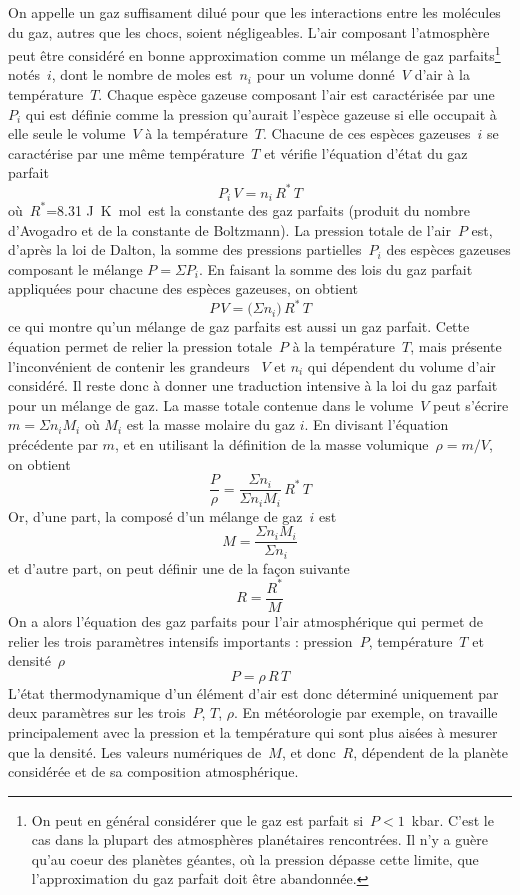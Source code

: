 \sk
On appelle  un gaz suffisament dilué pour que les interactions entre les molécules du gaz, autres que les chocs, soient négligeables. L'air composant l'atmosphère peut être considéré en bonne approximation comme un mélange de gaz parfaits\footnote{On peut en général considérer que le gaz est parfait si~$P < 1$~kbar. C'est le cas dans la plupart des atmosphères planétaires rencontrées. Il n'y a guère qu'au coeur des planètes géantes, où la pression dépasse cette limite, que l'approximation du gaz parfait doit être abandonnée.} notés~$i$, dont le nombre de moles est~$n_i$ pour un volume donné~$V$ d'air à la température~$T$. Chaque espèce gazeuse composant l'air est caractérisée par une ~$P_i$ qui est définie comme la pression qu'aurait l'espèce gazeuse si elle occupait à elle seule le volume~$V$ à la température~$T$. Chacune de ces espèces gazeuses~$i$ se caractérise par une même température~$T$ et vérifie l'équation d'état du gaz parfait $$ P_i \, V = n_i \, R^* \, T $$ où~$R^*$=8.31 J~K\mo~mol\mo~est la constante des gaz parfaits (produit du nombre d'Avogadro et de la constante de Boltzmann). La pression totale de l'air~$P$ est, d'après la loi de Dalton, la somme des pressions partielles~$P_i$ des espèces gazeuses composant le mélange $P=\Sigma P_i$. En faisant la somme des lois du gaz parfait appliquées pour chacune des espèces gazeuses, on obtient $$ P \, V = \big( \Sigma n_i \big) \, R^* \, T $$ ce qui montre qu'un mélange de gaz parfaits est aussi un gaz parfait. Cette équation permet de relier la pression totale~$P$ à la température~$T$, mais présente l'inconvénient de contenir les grandeurs ~$V$ et $n_i$ qui dépendent du volume d'air considéré. Il reste donc à donner une traduction intensive à la loi du gaz parfait pour un mélange de gaz. La masse totale contenue dans le volume~$V$ peut s'écrire $m=\Sigma n_iM_i$ où $M_i$ est la masse molaire du gaz $i$. En divisant l'équation précédente par $m$, et en utilisant la définition de la masse volumique~$\rho = m / V$, on obtient $$ \frac{P}{\rho} = \frac{\Sigma n_i}{\Sigma n_iM_i} \, R^* \, T $$ Or, d'une part, la  composé d'un mélange de gaz~$i$ est $$ \boxed{ M=\frac{\Sigma n_iM_i}{\Sigma n_i} }$$ et d'autre part, on peut définir une  de la façon suivante $$ R=\frac{R^*}{M} $$ On a alors l'équation des gaz parfaits pour l'air atmosphérique qui permet de relier les trois paramètres intensifs importants : pression~$P$, température~$T$ et densité~$\rho$ $$ \boxed{ P = \rho \, R \,T } $$ L'état thermodynamique d'un élément d'air est donc déterminé uniquement par deux paramètres sur les trois~$P$, $T$, $\rho$. En météorologie par exemple, on travaille principalement avec la pression et la température qui sont plus aisées à mesurer que la densité. Les valeurs numériques de~$M$, et donc~$R$, dépendent de la planète considérée et de sa composition atmosphérique. 

